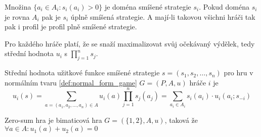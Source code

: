 \begin{definition}
\label{def:support_strategy}
Množina $\{a_i \in A_i : s_i(a_i) > 0\}$ je doména smíšené strategie $s_i$. Pokud doména $s_i$ je rovna $A_i$ pak je $s_i$ úplně smíšená strategie. A mají-li takovou všichni hráči tak pak i profil je profil plně smíšené strategie. 
\end{definition}
Pro každého hráče platí, že se snaží maximalizovat svůj očekávaný výdělek, tedy střední hodnota $u_i$ s $\prod^n_{j=1} s_j$. 
\begin{definition}
\label{def:expected_payoff}
Střední hodnota užitkové funkce smíšené strategie $s = (s_1, s_2, \dots, s_n)$ pro hru v normálním tvaru \ref{def:normal_form_game} $G= (P, A, u)$ hráče $i$ je 
\[
    u_i(s) = \sum_{a = (a_1, a_2, \dots, a_n) \in A} u_i(a) \prod_{j=1}^n s_j(a_j) = \sum_{a_i\in A_i} s_i(a_i) \cdot u_i(a_i; s_{-i})
\]
\end{definition}

\begin{definition}
\label{def:zero_sum}
Zero-sum hra je bimaticová hra $G = (\{1,2\}, A, u)$, taková že $\forall a \in A: u_1(a) + u_2(a) = 0$
\end{definition}
